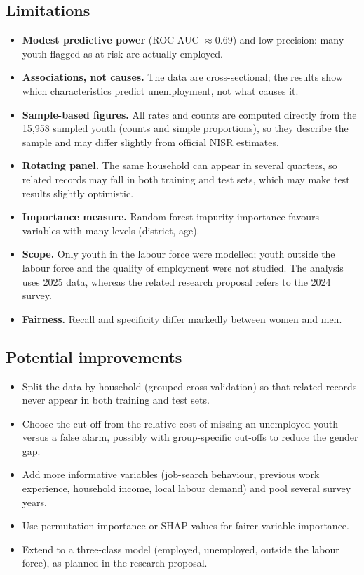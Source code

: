 \documentclass[11pt,a4paper]{article}
\begin{document}
\subsection{Limitations}
\begin{itemize}
\item \textbf{Modest predictive power} (ROC AUC $\approx 0.69$) and low precision: many youth flagged
      as at risk are actually employed.
\item \textbf{Associations, not causes.} The data are cross-sectional; the results show which
      characteristics predict unemployment, not what causes it.
\item \textbf{Sample-based figures.} All rates and counts are computed directly from the 15{,}958
      sampled youth (counts and simple proportions), so they describe the sample and may differ
      slightly from official NISR estimates.
\item \textbf{Rotating panel.} The same household can appear in several quarters, so related records
      may fall in both training and test sets, which may make test results slightly optimistic.
\item \textbf{Importance measure.} Random-forest impurity importance favours variables with many
      levels (district, age).
\item \textbf{Scope.} Only youth in the labour force were modelled; youth outside the labour force and
      the quality of employment were not studied. The analysis uses 2025 data, whereas the related
      research proposal refers to the 2024 survey.
\item \textbf{Fairness.} Recall and specificity differ markedly between women and men.
\end{itemize}

\subsection{Potential improvements}
\begin{itemize}
\item Split the data by household (grouped cross-validation) so that related records never appear in
      both training and test sets.
\item Choose the cut-off from the relative cost of missing an unemployed youth versus a false alarm,
      possibly with group-specific cut-offs to reduce the gender gap.
\item Add more informative variables (job-search behaviour, previous work experience, household income,
      local labour demand) and pool several survey years.
\item Use permutation importance or SHAP values for fairer variable importance.
\item Extend to a three-class model (employed, unemployed, outside the labour force), as planned in the
      research proposal.
\end{itemize}
\end{document}

